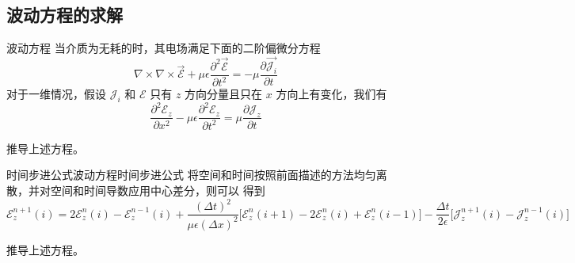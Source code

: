 \subsection{波动方程的求解}

\begin{theorem}{波动方程}
    当介质为无耗的时，其电场满足下面的二阶偏微分方程
    \begin{equation}
        \nabla \times \nabla \times \vec{\mathscr{E}}
        +\mu \epsilon \frac{\partial^2 \vec{\mathscr{E}}}{\partial t^2}
        =-\mu \frac{\partial \vec{\mathscr{J}_i}}{\partial t}
    \end{equation}
    对于一维情况，假设 $\mathscr{J}_i$ 和 $\mathscr{E}$ 
    只有 $z$ 方向分量且只在 $x$ 方向上有变化，我们有
    \begin{equation}
        \frac{\partial^2 \mathscr{E}_z}{\partial x^2}
        -\mu \epsilon \frac{\partial^2 \mathscr{E}_z}{\partial t^2}
        =\mu \frac{\partial \mathscr{J}_z}{\partial t}
        \label{一维波动方程}
    \end{equation}
\end{theorem}

\begin{exercise}
    推导上述方程。
\end{exercise}

\begin{theorem}{时间步进公式}{波动方程时间步进公式}
    将空间和时间按照前面描述的方法均匀离散，并对空间和时间导数应用中心差分，则可以
    得到
    \begin{equation}
        \mathscr{E}_z^{n+1}(i)=2\mathscr{E}_z^n(i)-\mathscr{E}_z^{n-1}(i)
        +\frac{(\Delta t)^2}{\mu \epsilon (\Delta x)^2}
        \Big[\mathscr{E}_z^n(i+1)-2\mathscr{E}_z^n(i)+\mathscr{E}_z^n(i-1)\Big]
        -\frac{\Delta t}{2\epsilon}\Big[\mathscr{J}_z^{n+1}(i)-\mathscr{J}_z^{n-1}(i)\Big]
    \end{equation}
\end{theorem}

\begin{exercise}
    推导上述方程。
\end{exercise}

